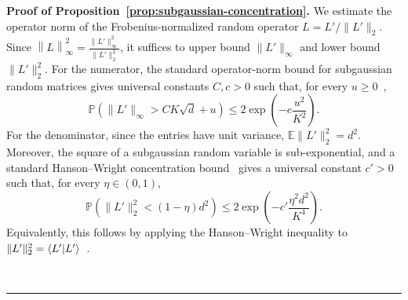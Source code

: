 \documentclass[superscriptaddress,amsmath,amssymb,aps,pra,letterpaper,tightenlines,notitlepages,12pt]{revtex4-2}
\newenvironment{proof}[1][Proof]{\noindent\textbf{#1.} }{\ \rule{0.5em}{0.5em}}
\begin{document}
\begin{proof}[Proof of Proposition~\ref{prop:subgaussian-concentration}]
    We estimate the operator norm of the Frobenius-normalized random operator $L=L'/\|L'\|_2$. Since $\left\|L\right\|_\infty^2 = \frac{\|L'\|_\infty^2}{\|L'\|_2^2}$, it suffices to upper bound $\|L'\|_\infty$ and lower bound $\|L'\|_2^2$.
    For the numerator, the standard operator-norm bound for subgaussian random matrices gives universal constants $C,c>0$ such that, for every $u\ge0$~\cite[Theorem~4.4.3]{vershynin2018HighDimensionalProbabilityIntroduction},
    \begin{equation}
        \mathbb{P}\!\left(\|L'\|_\infty > C K \sqrt d + u\right)
        \le 2\exp\!\left(-c\frac{u^2}{K^2}\right).
    \end{equation}
    For the denominator, since the entries have unit variance, $\mathbb{E}\|L'\|_2^2=d^2$. 
    Moreover, the square of a subgaussian random variable is sub-exponential, and a standard Hanson--Wright concentration bound~\cite{hanson1971BoundTailProbabilities} gives a universal constant $c'>0$ such that, for every $\eta\in(0,1)$,
    \begin{equation}
        \mathbb{P}\!\left(\|L'\|_2^2 < (1-\eta)d^2 \right)
        \le2\exp\!\left(-c'\frac{\eta^2d^2}{K^4}\right).
    \end{equation}
    Equivalently, this follows by applying the Hanson--Wright inequality to $\|L'\|_2^2=\braket{L'}{L'}$~\cite[Theorem~6.2.2]{vershynin2018HighDimensionalProbabilityIntroduction}.
    

\end{proof}
\end{document}
